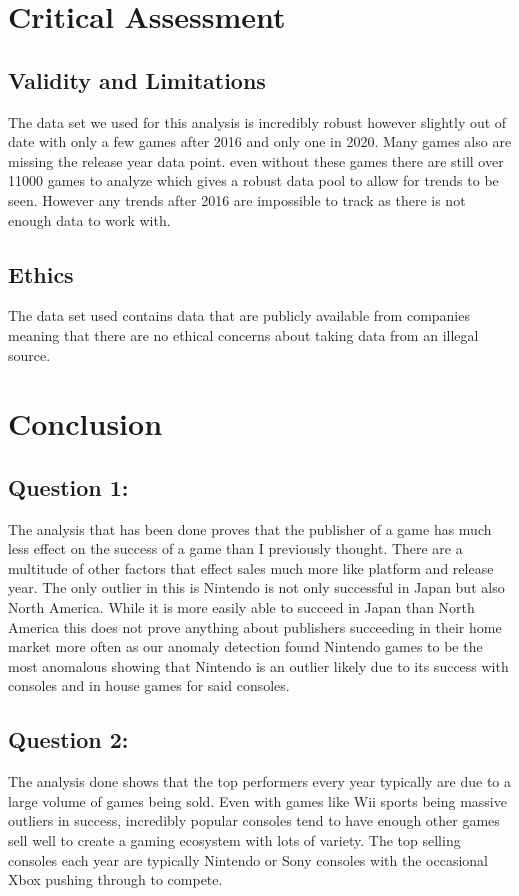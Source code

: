 \documentclass[conference]{IEEEtran}
\begin{document}
\section{Critical Assessment}
\subsection{Validity and Limitations}
The data set we used for this analysis is incredibly robust however slightly out of date with only a few games after 2016 and only one in 2020. Many games also are missing the release year data point. even without these games there are still over 11000 games to analyze which gives a robust data pool to allow for trends to be seen. However any trends after 2016 are impossible to track as there is not enough data to work with.
\subsection{Ethics}
The data set used contains data that are publicly available from companies meaning that there are no ethical concerns about taking data from an illegal source.
\section{Conclusion}
\subsection{Question 1:}
The analysis that has been done proves that the publisher of a game has much less effect on the success of a game than I previously thought. There are a multitude of other factors that effect sales much more like platform and release year. The only outlier in this is Nintendo is not only successful in Japan but also North America. While it is more easily able to succeed in Japan than North America this does not prove anything about publishers succeeding in their home market more often as our anomaly detection found Nintendo games to be the most anomalous showing that Nintendo is an outlier likely due to its success with consoles and in house games for said consoles.
\subsection{Question 2:}
The analysis done shows that the top performers every year typically are due to a large volume of games being sold. Even with games like Wii sports being massive outliers in success, incredibly popular consoles tend to have enough other games sell well to create a gaming ecosystem with lots of variety. The top selling consoles each year are typically Nintendo or Sony consoles with the occasional Xbox pushing through to compete.  
\end{document}
